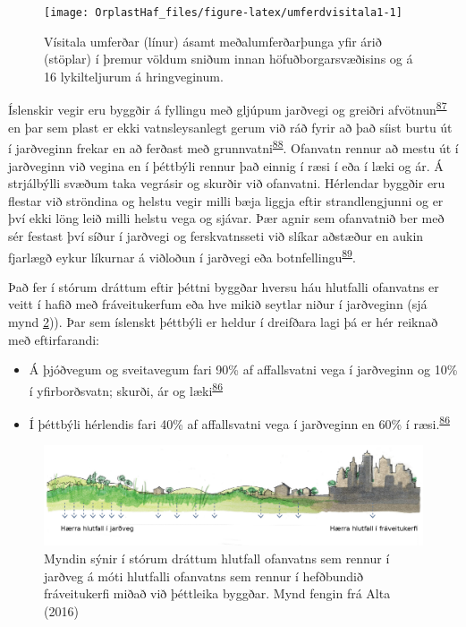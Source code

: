 \documentclass[icelandic,]{book}
\providecommand{\tightlist}{%
  \setlength{\itemsep}{0pt}\setlength{\parskip}{0pt}}
\begin{document}
\begin{figure}

{\centering \texttt{[image: OrplastHaf\_files/figure-latex/umferdvisitala1-1]} 

}

\caption{Vísitala umferðar (línur) ásamt meðalumferðarþunga yfir árið (stöplar) í þremur völdum sniðum innan höfuðborgarsvæðisins og á 16 lykilteljurum á hringveginum.}\label{fig:umferdvisitala1}
\end{figure}

Íslenskir vegir eru byggðir á fyllingu með gljúpum jarðvegi og greiðri afvötnun\textsuperscript{\protect\hyperlink{ref-Matinupa2012Summary}{87}} en þar sem plast er ekki vatnsleysanlegt gerum við ráð fyrir að það síist burtu út í jarðveginn frekar en að ferðast með grunnvatni\textsuperscript{\protect\hyperlink{ref-ECHA2016}{88}}. Ofanvatn rennur að mestu út í jarðveginn við vegina en í þéttbýli rennur það einnig í ræsi í eða í læki og ár. Á strjálbýlli svæðum taka vegrásir og skurðir við ofanvatni. Hérlendar byggðir eru flestar við ströndina og helstu vegir milli bæja liggja eftir strandlengjunni og er því ekki löng leið milli helstu vega og sjávar. Þær agnir sem ofanvatnið ber með sér festast því síður í jarðvegi og ferskvatnsseti við slíkar aðstæður en aukin fjarlægð eykur líkurnar á viðloðun í jarðvegi eða botnfellingu\textsuperscript{\protect\hyperlink{ref-BESSELING2017540}{89}}.

Það fer í stórum dráttum eftir þéttni byggðar hversu háu hlutfalli ofanvatns er veitt í hafið með fráveitukerfum eða hve mikið seytlar niður í jarðveginn (sjá mynd \ref{fig:ALTA})). Þar sem íslenskt þéttbýli er heldur í dreifðara lagi þá er hér reiknað með eftirfarandi:

\begin{itemize}
\tightlist
\item
  Á þjóðvegum og sveitavegum fari 90\% af affallsvatni vega í jarðveginn og 10\% í yfirborðsvatn; skurði, ár og læki\textsuperscript{\protect\hyperlink{ref-Verschoor2016}{86}}
\item
  Í þéttbýli hérlendis fari 40\% af affallsvatni vega í jarðveginn en 60\% í ræsi.\textsuperscript{\protect\hyperlink{ref-Verschoor2016}{86}}
\end{itemize}

\begin{figure}

{\centering \includegraphics[width=1\linewidth]{myndir/ALTA} 

}

\caption{Myndin sýnir í stórum dráttum hlutfall ofanvatns sem rennur í jarðveg á móti hlutfalli ofanvatns sem rennur í hefðbundið fráveitukerfi miðað við þéttleika byggðar. Mynd fengin frá Alta (2016)}\label{fig:ALTA}
\end{figure}
\end{document}
